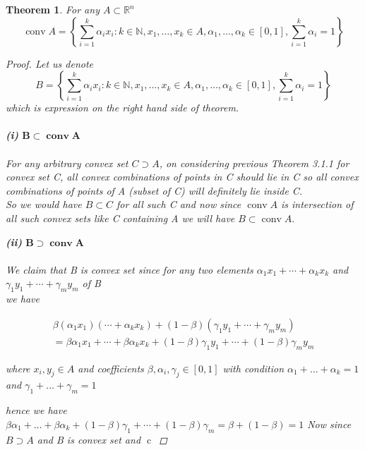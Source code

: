 \documentclass[oneside]{book}
\newtheorem{theorem}{Theorem}[section]
\theoremstyle{definition}
\begin{document}
 

\begin{theorem}
\label{t:5}
For  any $A \subset \mathbb{R}^n$
 $$ \operatorname{conv} A=\left\{\sum_{i=1}^{k} \alpha_{i} x_{i}: k \in \mathbb{N}, x_{1}, \ldots, x_{k} \in A, \alpha_{1}, \ldots, \alpha_{k} \in[0,1], \sum_{i=1}^{k} \alpha_{i}=1\right\} $$

 \begin{proof}
 Let us denote $$ B = \left\{\sum_{i=1}^{k} \alpha_{i} x_{i}: k \in \mathbb{N}, x_{1}, \ldots, x_{k} \in A, \alpha_{1}, \ldots, \alpha_{k} \in[0,1], \sum_{i=1}^{k} \alpha_{i}=1\right\} $$  which is expression on the right hand side of theorem.\\\\
 \textbf{(i)}  $ \mathbf{B} \subset \mathbf{\operatorname{conv} A}  $\\\\
     For any arbitrary convex set $C \supset A$, on considering previous Theorem 3.1.1 for convex set C, all convex combinations of points in C should lie in C so all convex combinations of points of A (subset of  C) will definitely lie inside C. \\ 
 So we would have $B\subset C $ for all such C and now since  $\operatorname{conv} A $ is intersection of all such convex sets like C containing A we will have  $ B \subset \operatorname{conv} A.  $  
 
 \textbf{(ii)}  $ \mathbf{B} \supset \mathbf{\operatorname{conv} A}  $\\\\
 We claim that B is convex set since for any two elements $\alpha_{1} x_{1}+\cdots+\alpha_{k} x_{k}$ and \\ $\gamma_{1} y_{1}+\cdots+\gamma_{m} y_{m}$  of B \\
 we have 
 
 
\begin{multline}
         \beta\left(\alpha_{1} x_{1}\right)  \left(\cdots+\alpha_{k} x_{k} \right) +(1-\beta)\left(\gamma_{1} y_{1}+\cdots+\gamma_{m} y_{m}\right) \\ = \beta \alpha_{1} x_{1}+\cdots+\beta \alpha_{k} x_{k}+(1-\beta) \gamma_{1} y_{1}+\cdots+(1-\beta) \gamma_{m} y_{m}  
\end{multline}
 
 where  $x_{i}, y_{j} \in A$ and coefficients $\beta, \alpha_{i}, \gamma_{j} \in[0,1]$ with  condition $\alpha_{1}+\ldots+\alpha_{k}=1$ and $\gamma_{1}+\ldots+\gamma_{m}=1$ 

hence we have \\
$
\beta \alpha_{1}+\ldots+\beta \alpha_{k}+(1-\beta) \gamma_{1}+\cdots+(1-\beta) \gamma_{m}=\beta+(1-\beta)=1
$
Now since $ B \supset A $ and B is convex set and $\operatorname{c}$
 

\end{proof}
\end{theorem}
\end{document}
